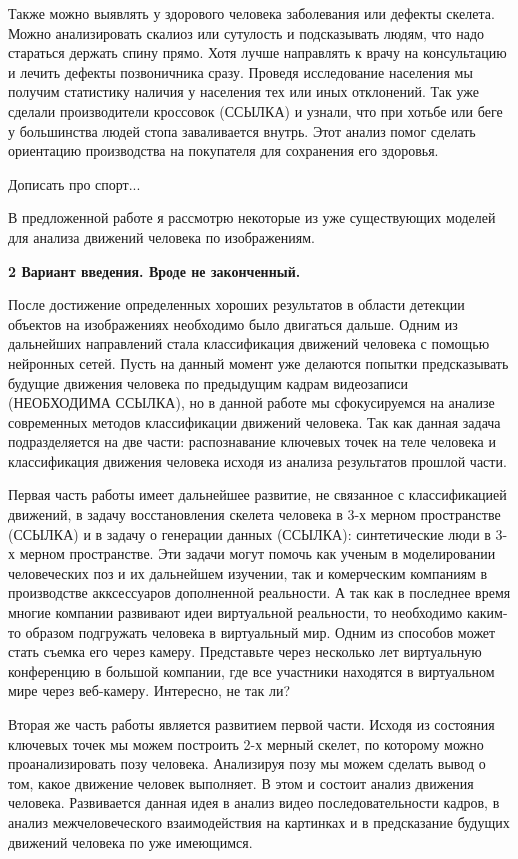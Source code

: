 Также можно выявлять у здорового человека заболевания или дефекты скелета. Можно анализировать скалиоз или сутулость и подсказывать людям, что надо стараться держать спину прямо. Хотя лучше направлять к врачу на консультацию и лечить дефекты позвоничника сразу. Проведя исследование населения мы получим статистику наличия у населения тех или иных отклонений. Так уже сделали производители кроссовок (ССЫЛКА) и узнали, что при хотьбе или беге у большинства людей стопа заваливается внутрь. Этот анализ помог сделать ориентацию производства на покупателя для сохранения его здоровья.

Дописать про спорт...




В предложенной работе я рассмотрю некоторые из уже существующих моделей для анализа движений человека по изображениям.

\hfill \break
\textbf{\Large 2 Вариант введения. Вроде не законченный.}

После достижение определенных хороших результатов в области детекции объектов на изображениях необходимо было двигаться дальше. Одним из дальнейших направлений стала классификация движений человека с помощью нейронных сетей. Пусть на данный момент уже делаются попытки предсказывать будущие движения человека по предыдущим кадрам видеозаписи (НЕОБХОДИМА ССЫЛКА), но в данной работе мы сфокусируемся на анализе современных методов классификации движений человека. Так как данная задача подразделяется на две части: распознавание ключевых точек на теле человека и классификация движения человека исходя из анализа результатов прошлой части.

Первая часть работы имеет дальнейшее развитие, не связанное с классификацией движений,  в задачу восстановления скелета человека в 3-х мерном пространстве (ССЫЛКА) и в задачу о генерации данных (ССЫЛКА): синтетические люди в 3-х мерном пространстве. Эти задачи могут помочь как ученым в моделировании человеческих поз и их дальнейшем изучении, так и комерческим компаниям в производстве акксессуаров дополненной реальности. А так как в последнее время многие компании развивают идеи виртуальной реальности, то необходимо каким-то образом подгружать человека в виртуальный мир. Одним из способов может стать съемка его через камеру. Представьте через несколько лет виртуальную конференцию в большой компании, где все участники находятся в виртуальном мире через веб-камеру. Интересно, не так ли?

Вторая же часть работы является развитием первой части. Исходя из состояния ключевых точек мы можем построить 2-х мерный скелет, по которому можно проанализировать позу человека. Анализируя позу мы можем сделать вывод о том, какое движение человек выполняет. В этом и состоит анализ движения человека. Развивается данная идея в анализ видео последовательности кадров, в анализ межчеловеческого взаимодействия на картинках и в предсказание будущих движений человека по уже имеющимся.  

